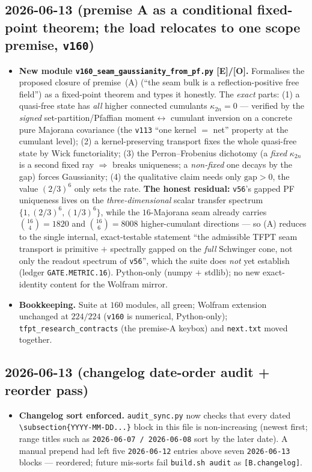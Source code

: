 \documentclass[11pt]{article}
\providecommand{\mE}{\textbf{[E]}}\providecommand{\mC}{\textbf{[C]}}
\providecommand{\mO}{\textbf{[O]}}\providecommand{\mX}{\textbf{[X]}}
\providecommand{\vref}[1]{\texttt{#1}}
\begin{document}
\subsection*{2026-06-13 (premise A as a conditional fixed-point theorem; the load relocates to one scope premise, \vref{v160})}
\begin{itemize}
\item \textbf{New module \texttt{v160\_seam\_gaussianity\_from\_pf.py} \mE/\mO.} Formalises the proposed
  closure of premise~(A) (``the seam bulk is a reflection-positive free field'') as a fixed-point theorem
  and types it honestly. The \emph{exact} parts: (1) a quasi-free state has \emph{all} higher connected
  cumulants $\kappa_{2n}{=}0$ --- verified by the \emph{signed} set-partition/Pfaffian moment$\leftrightarrow$%
  cumulant inversion on a concrete pure Majorana covariance (the \vref{v113} ``one kernel $=$ net'' property
  at the cumulant level); (2) a kernel-preserving transport fixes the whole quasi-free state by Wick
  functoriality; (3) the Perron--Frobenius dichotomy (a \emph{fixed} $\kappa_{2n}$ is a second fixed ray
  $\Rightarrow$ breaks uniqueness; a \emph{non-fixed} one decays by the gap) forces Gaussianity; (4) the
  qualitative claim needs only $\mathrm{gap}{>}0$, the value $(2/3)^6$ only sets the rate. \textbf{The
  honest residual:} \vref{v56}'s gapped PF uniqueness lives on the \emph{three-dimensional} scalar transfer
  spectrum $\{1,(2/3)^6,(1/3)^6\}$, while the $16$-Majorana seam already carries $\binom{16}{4}{=}1820$ and
  $\binom{16}{6}{=}8008$ higher-cumulant directions --- so (A) reduces to the single internal, exact-testable
  statement ``the admissible TFPT seam transport is primitive $+$ spectrally gapped on the \emph{full}
  Schwinger cone, not only the readout spectrum of \vref{v56}'', which the suite does \emph{not} yet
  establish (ledger \texttt{GATE.METRIC.16}). Python-only (numpy $+$ stdlib); no new exact-identity content
  for the Wolfram mirror.
\item \textbf{Bookkeeping.} Suite at $160$ modules, all green; Wolfram extension unchanged at $224/224$
  (\vref{v160} is numerical, Python-only); \texttt{tfpt\_research\_contracts} (the premise-A keybox) and
  \texttt{next.txt} moved together.
\end{itemize}

\subsection*{2026-06-13 (changelog date-order audit + reorder pass)}
\begin{itemize}
\item \textbf{Changelog sort enforced.} \texttt{audit\_sync.py} now checks that every
  dated \texttt{\textbackslash subsection\*\{YYYY-MM-DD...\}} block in this file is
  non-increasing (newest first; range titles such as \texttt{2026-06-07 / 2026-06-08}
  sort by the later date). A manual prepend had left five \texttt{2026-06-12} entries
  above seven \texttt{2026-06-13} blocks --- reordered; future mis-sorts fail
  \texttt{build.sh audit} as \texttt{[B.changelog]}.
\end{itemize}
\end{document}

